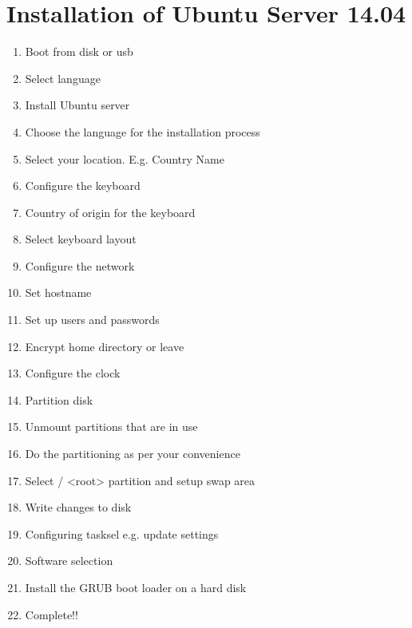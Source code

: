 \documentclass[letterpaper,10pt,english]{sphinxmanual}
\begin{document}
\section{Installation of Ubuntu Server 14.04}
\label{_source/installation_guide/ubuntu_installation:installation-of-ubuntu-server-14-04}\label{_source/installation_guide/ubuntu_installation::doc}\begin{enumerate}
\item {} 
Boot from disk or usb

\item {} 
Select language

\item {} 
Install Ubuntu server

\item {} 
Choose the language for the installation process

\item {} 
Select your location. E.g. Country Name

\item {} 
Configure the keyboard

\item {} 
Country of origin for the keyboard

\item {} 
Select keyboard layout

\item {} 
Configure the network

\item {} 
Set hostname

\item {} 
Set up users and passwords

\item {} 
Encrypt home directory or leave

\item {} 
Configure the clock

\item {} 
Partition disk

\item {} 
Unmount partitions that are in use

\item {} 
Do the partitioning as per your convenience

\item {} 
Select / \textless{}root\textgreater{} partition and setup swap area

\item {} 
Write changes to disk

\item {} 
Configuring tasksel e.g. update settings

\item {} 
Software selection

\item {} 
Install the GRUB boot loader on a hard disk

\item {} 
Complete!!

\end{enumerate}
\end{document}
